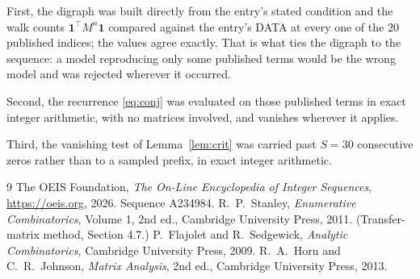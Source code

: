 \documentclass[11pt,a4paper]{article}
\theoremstyle{plain}
\theoremstyle{definition}
\begin{document}
First, the digraph was built directly from the entry's stated condition and the walk counts
$\mathbf{1}^{\!\top}M^{n}\mathbf{1}$ compared against the entry's DATA at every one of
the $20$ published indices; the values agree exactly. That is what ties the digraph to
the sequence: a model reproducing only some published terms would be the wrong model and
was rejected wherever it occurred.

Second, the recurrence \eqref{eq:conj} was evaluated on those published terms in exact
integer arithmetic, with no matrices involved, and vanishes wherever it applies.

Third, the vanishing test of Lemma~\ref{lem:crit} was carried past $S=30$ consecutive
zeros rather than to a sampled prefix, in exact integer arithmetic.

\begin{thebibliography}{9}
 The OEIS Foundation, \emph{The On-Line Encyclopedia of Integer
Sequences}, \url{https://oeis.org}, 2026. Sequence A234984.
 R.~P.~Stanley, \emph{Enumerative Combinatorics}, Volume 1, 2nd ed.,
Cambridge University Press, 2011. (Transfer-matrix method, Section 4.7.)
 P.~Flajolet and R.~Sedgewick, \emph{Analytic Combinatorics}, Cambridge
University Press, 2009.
 R.~A.~Horn and C.~R.~Johnson, \emph{Matrix Analysis}, 2nd ed., Cambridge
University Press, 2013.
\end{thebibliography}
\end{document}
